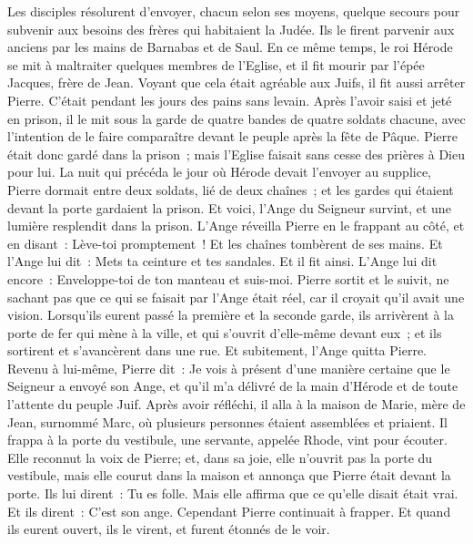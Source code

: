 \begin{multicols}{2}
Les disciples résolurent d'envoyer, chacun selon ses moyens, quelque secours pour subvenir aux besoins des frères qui habitaient la Judée.
Ils le firent parvenir aux anciens par les mains de Barnabas et de Saul.
\VerseOne{}En ce même temps, le roi Hérode se mit à maltraiter quelques membres de l'Eglise,
et il fit mourir par l'épée Jacques, frère de Jean.
Voyant que cela était agréable aux Juifs, il fit aussi arrêter Pierre. C'était pendant les jours des pains sans levain.
Après l'avoir saisi et jeté en prison, il le mit sous la garde de quatre bandes de quatre soldats chacune, avec l'intention de le faire comparaître devant le peuple après la fête de Pâque.
Pierre était donc gardé dans la prison~; mais l'Eglise faisait sans cesse des prières à Dieu pour lui.
La nuit qui précéda le jour où Hérode devait l'envoyer au supplice, Pierre dormait entre deux soldats, lié de deux chaînes~; et les gardes qui étaient devant la porte gardaient la prison.
Et voici, l'Ange du Seigneur survint, et une lumière resplendit dans la prison. L'Ange réveilla Pierre en le frappant au côté, et en disant~: Lève-toi promptement~! Et les chaînes tombèrent de ses mains.
Et l'Ange lui dit~: Mets ta ceinture et tes sandales. Et il fit ainsi. L'Ange lui dit encore~: Enveloppe-toi de ton manteau et suis-moi.
Pierre sortit et le suivit, ne sachant pas que ce qui se faisait par l'Ange était réel, car il croyait qu'il avait une vision.
Lorsqu'ils eurent passé la première et la seconde garde, ils arrivèrent à la porte de fer qui mène à la ville, et qui s'ouvrit d'elle-même devant eux~; et ils sortirent et s'avancèrent dans une rue. Et subitement, l'Ange quitta Pierre.
Revenu à lui-même, Pierre dit~: Je vois à présent d'une manière certaine que le Seigneur a envoyé son Ange, et qu'il m'a délivré de la main d'Hérode et de toute l'attente du peuple Juif.
Après avoir réfléchi, il alla à la maison de Marie, mère de Jean, surnommé Marc, où plusieurs personnes étaient assemblées et priaient.
Il frappa à la porte du vestibule, une servante, appelée Rhode, vint pour écouter.
Elle reconnut la voix de Pierre; et, dans sa joie, elle n'ouvrit pas la porte du vestibule, mais elle courut dans la maison et annonça que Pierre était devant la porte.
Ils lui dirent~: Tu es folle. Mais elle affirma que ce qu'elle disait était vrai.
Et ils dirent~: C'est son ange. Cependant Pierre continuait à frapper. Et quand ils eurent ouvert, ils le virent, et furent étonnés de le voir.

\end{multicols}
